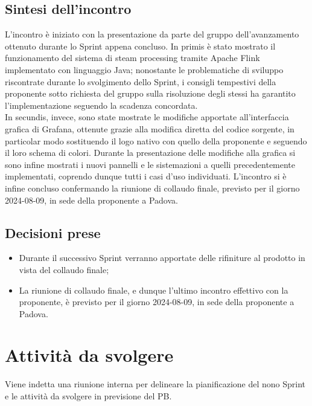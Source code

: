 \documentclass[8pt]{article}
\newcommand{\signatureline}[1]{%
	 \par\vspace{0.5cm}
	\noindent\makebox[\linewidth][r]{\rule{0.2\textwidth}{0.5pt}\hspace{3cm}\makebox[0pt][r]{\vspace{3pt}\footnotesize #1}}%
}
\begin{document}
\subsection{Sintesi dell'incontro}
L'incontro è iniziato con la presentazione da parte del gruppo dell'avanzamento ottenuto durante lo Sprint appena concluso. In primis è stato mostrato il funzionamento del sistema di steam processing tramite Apache Flink implementato con linguaggio Java; nonostante le problematiche di sviluppo riscontrate durante lo svolgimento dello Sprint, i consigli tempestivi della proponente sotto richiesta del gruppo sulla risoluzione degli stessi ha garantito l'implementazione seguendo la scadenza concordata.\\
In secundis, invece, sono state mostrate le modifiche apportate all'interfaccia grafica di Grafana, ottenute grazie alla modifica diretta del codice sorgente, in particolar modo sostituendo il logo nativo con quello della proponente e seguendo il loro schema di colori. Durante la presentazione delle modifiche alla grafica si sono infine mostrati i nuovi pannelli e le sistemazioni a quelli precedentemente implementati, coprendo dunque tutti i casi d'uso individuati.
L'incontro si è infine concluso confermando la riunione di collaudo finale, previsto per il giorno 2024-08-09, in sede della proponente a Padova.

\subsection{Decisioni prese}
\begin{itemize}
    \setlength\itemsep{0em}
	\item Durante il successivo Sprint verranno apportate delle rifiniture al prodotto in vista del collaudo finale;
	\item La riunione di collaudo finale, e dunque l'ultimo incontro effettivo con la proponente, è previsto per il giorno 2024-08-09, in sede della proponente a Padova.
\end{itemize}

\section{Attività da svolgere}
Viene indetta una riunione interna per delineare la pianificazione del nono Sprint e le attività da svolgere in previsione del PB.
\signatureline{Padova, 2024-07-30}
\end{document}
